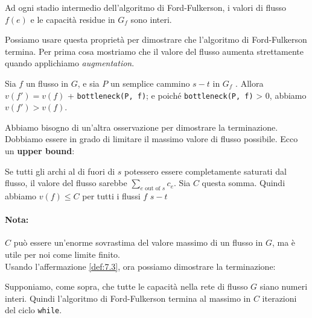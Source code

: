\begin{myblockquote}
	Ad ogni stadio intermedio dell'algoritmo di Ford-Fulkerson, i valori di
	flusso $f(e)$ e le capacità residue in $G_f$ sono interi.
\end{myblockquote}

Possiamo usare questa proprietà per dimostrare che l'algoritmo di
Ford-Fulkerson termina. Per prima cosa mostriamo che il valore del
flusso aumenta strettamente quando applichiamo \emph{augmentation}.\\

\begin{minipage}{\textwidth}
	\begin{myblockquote}
		\begin{definition}\label{def:7.3}
			Sia $f$ un flusso in $G$, e sia $P$ un semplice cammino $s-t$ in
			$G_f$ . Allora $v(f') = v(f)$ + \texttt{bottleneck(P,\ f)}; e poiché
			\texttt{bottleneck(P,\ f)} \textgreater{} 0, abbiamo $v(f') > v(f)$.
		\end{definition}
	\end{myblockquote}
\end{minipage}

Abbiamo bisogno di un'altra osservazione per dimostrare la terminazione.
Dobbiamo essere in grado di limitare il massimo valore di flusso
possibile. Ecco un \textbf{upper bound}:

\begin{myblockquote}
	Se tutti gli archi al di
	fuori di $s$ potessero essere completamente saturati dal flusso, il
	valore del flusso sarebbe $\sum_{e \text{ out of }s} c_e$. Sia $C$
	questa somma. Quindi abbiamo $v(f) \le C$ per tutti i flussi $f$
	$s-t$
\end{myblockquote}

\paragraph*{Nota:} $C$ può essere un'enorme sovrastima del valore massimo
di un flusso in $G$, ma è utile per noi come limite finito.\\

Usando l'affermazione \ref{def:7.3}, ora possiamo dimostrare la terminazione:

\begin{myblockquote}
	Supponiamo, come sopra, che tutte le capacità nella rete
	di flusso $G$ siano numeri interi. Quindi l'algoritmo di
	Ford-Fulkerson termina al massimo in $C$ iterazioni del ciclo
	\texttt{while}.
\end{myblockquote}



